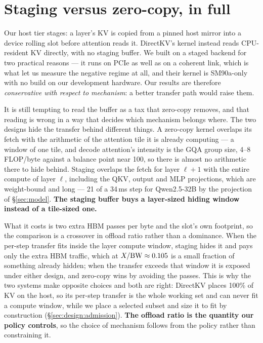 
\section{Staging versus zero-copy, in full}
\label{app:coherence}

Our host tier stages: a layer's KV is copied from a pinned host mirror into a
device rolling slot before attention reads it. DirectKV's kernel instead reads
CPU-resident KV directly, with no staging buffer. We built on a staged backend
for two practical reasons --- it runs on PCIe as well as on a coherent link,
which is what let us measure the negative regime at all, and their kernel is
SM90a-only with no build on our development hardware. Our results are therefore
\emph{conservative with respect to mechanism}: a better transfer path would
raise them.

It is still tempting to read the buffer as a tax that zero-copy removes, and
that reading is wrong in a way that decides which mechanism belongs where. The
two designs hide the transfer behind different things. A zero-copy kernel
overlaps its fetch with the arithmetic of the attention tile it is already
computing --- a window of one tile, and decode attention's intensity is the GQA
group size, 4--8 FLOP/byte against a balance point near 100, so there is almost
no arithmetic there to hide behind. Staging overlaps the fetch for layer
$\ell{+}1$ with the entire compute of layer $\ell$, including the QKV, output
and MLP projections, which are weight-bound and long --- 21 of a 34\,ms step for
Qwen2.5-32B by the projection of \S\ref{sec:model}. \textbf{The staging buffer
buys a layer-sized hiding window instead of a tile-sized one.}

What it costs is two extra HBM passes per byte and the slot's own footprint, so
the comparison is a crossover in offload ratio rather than a dominance. When the
per-step transfer fits inside the layer compute window, staging hides it and pays
only the extra HBM traffic, which at $X/\mathrm{BW} \approx 0.105$ is a small
fraction of something already hidden; when the transfer exceeds that window it is
exposed under either design, and zero-copy wins by avoiding the passes. This is
why the two systems make opposite choices and both are right: DirectKV places
100\% of KV on the host, so its per-step transfer is the whole working set and can
never fit a compute window, while we place a selected subset and size it to fit
by construction (\S\ref{sec:design:admission}). \textbf{The offload ratio is the
quantity our policy controls}, so the choice of mechanism follows from the policy
rather than constraining it.

